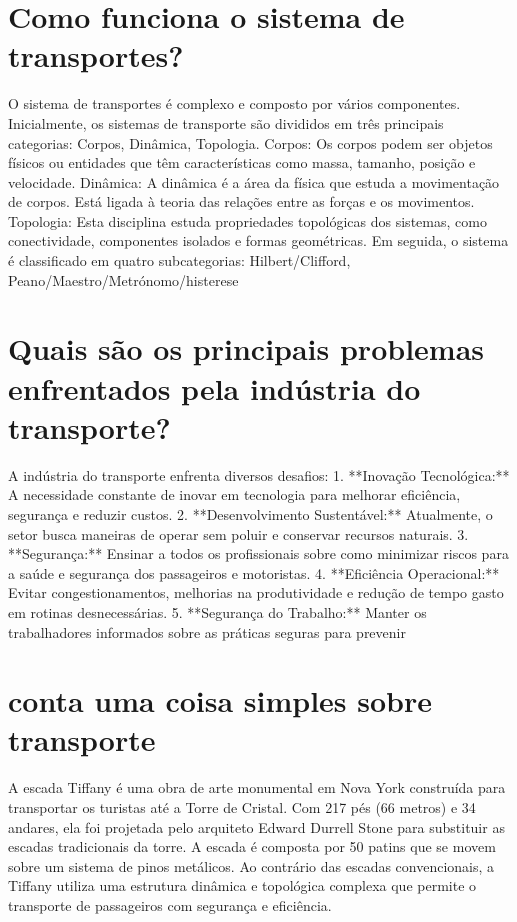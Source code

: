 \documentclass[11pt,a4paper]{article}
\begin{document}
\section{Como funciona o sistema de transportes?}
O sistema de transportes é complexo e composto por vários componentes. Inicialmente, os sistemas de transporte são divididos em três principais categorias: Corpos, Dinâmica, Topologia. Corpos: Os corpos podem ser objetos físicos ou entidades que têm características como massa, tamanho, posição e velocidade. Dinâmica: A dinâmica é a área da física que estuda a movimentação de corpos. Está ligada à teoria das relações entre as forças e os movimentos. Topologia: Esta disciplina estuda propriedades topológicas dos sistemas, como conectividade, componentes isolados e formas geométricas. Em seguida, o sistema é classificado em quatro subcategorias: Hilbert/Clifford, Peano/Maestro/Metrónomo/histerese

\section{Quais são os principais problemas enfrentados pela indústria do transporte?}
A indústria do transporte enfrenta diversos desafios: 1. **Inovação Tecnológica:** A necessidade constante de inovar em tecnologia para melhorar eficiência, segurança e reduzir custos. 2. **Desenvolvimento Sustentável:** Atualmente, o setor busca maneiras de operar sem poluir e conservar recursos naturais. 3. **Segurança:** Ensinar a todos os profissionais sobre como minimizar riscos para a saúde e segurança dos passageiros e motoristas. 4. **Eficiência Operacional:** Evitar congestionamentos, melhorias na produtividade e redução de tempo gasto em rotinas desnecessárias. 5. **Segurança do Trabalho:** Manter os trabalhadores informados sobre as práticas seguras para prevenir

\section{conta uma coisa simples sobre transporte}
A escada Tiffany é uma obra de arte monumental em Nova York construída para transportar os turistas até a Torre de Cristal. Com 217 pés (66 metros) e 34 andares, ela foi projetada pelo arquiteto Edward Durrell Stone para substituir as escadas tradicionais da torre. A escada é composta por 50 patins que se movem sobre um sistema de pinos metálicos. Ao contrário das escadas convencionais, a Tiffany utiliza uma estrutura dinâmica e topológica complexa que permite o transporte de passageiros com segurança e eficiência.
\end{document}
